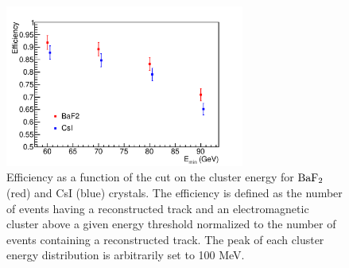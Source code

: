 \begin{figure}[htb]
\begin{center}
   \includegraphics[width=0.7\textwidth]{Figures/effi.pdf}
\end{center}
\caption
{Efficiency as a function of the cut on the cluster energy for $\rm BaF_2$ (red) and CsI (blue) crystals. The efficiency is defined as the number of 
events having a reconstructed track and an electromagnetic cluster above a given energy threshold normalized to the number of events containing a reconstructed 
track. The peak of each cluster energy distribution is arbitrarily set to 100 MeV.}
\label{sim::fig::effi}
\end{figure}

\clearpage
